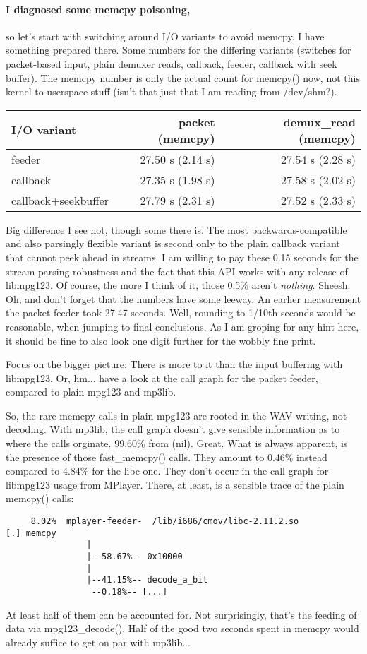 \documentclass[a4paper,12pt]{scrartcl}
\begin{document}
\paragraph{I diagnosed some memcpy poisoning,}
so let's start with switching around I/O variants to avoid memcpy. I have something prepared there.
Some numbers for the differing variants (switches for packet-based input, plain demuxer reads, callback, feeder, callback with seek buffer).
The memcpy number is only the actual count for memcpy() now, not this kernel-to-userspace stuff (isn't that just that I am reading from /dev/shm?).
\begin{center}
\begin{tabular}{lrr}
I/O variant & packet (memcpy) & demux\_read (memcpy)
\\\hline
feeder   & 27.50 s (2.14 s) & 27.54 s (2.28 s) \\ 
callback & 27.35 s (1.98 s) & 27.58 s (2.02 s) \\
callback+seekbuffer
         & 27.79 s (2.31 s) & 27.52 s (2.33 s)
\end{tabular}
\end{center}
Big difference I see not, though some there is.
The most backwards-compatible and also parsingly flexible variant is second only to the plain callback variant that cannot peek ahead in streams.
I am willing to pay these 0.15 seconds for the stream parsing robustness and the fact that this API works with any release of libmpg123. Of course, the more I think of it, those 0.5\% aren't {\em nothing}. Sheesh.
Oh, and don't forget that the numbers have some leeway. An earlier measurement the packet feeder took 27.47 seconds.
Well, rounding to 1/10th seconds would be reasonable, when jumping to final conclusions. As I am groping for any hint here, it should be fine to also look one digit further for the wobbly fine print.

Focus on the bigger picture: There is more to it than the input buffering with libmpg123.
Or, hm... have a look at the call graph for the packet feeder, compared to plain mpg123 and mp3lib.

So, the rare memcpy calls in plain mpg123 are rooted in the WAV writing, not decoding.
With mp3lib, the call graph doesn't give sensible information as to where the calls orginate. 99.60\% from (nil). Great.
What is always apparent, is the presence of those fast\_memcpy() calls. They amount to 0.46\% instead compared to 4.84\% for the libc one.
They don't occur in the call graph for libmpg123 usage from MPlayer.
There, at least, is a sensible trace of the plain memcpy() calls: 
\begin{verbatim}
     8.02%  mplayer-feeder-  /lib/i686/cmov/libc-2.11.2.so                                        [.] memcpy
                |          
                |--58.67%-- 0x10000
                |          
                |--41.15%-- decode_a_bit
                 --0.18%-- [...]
\end{verbatim}
At least half of them can be accounted for. Not surprisingly, that's the feeding of data via mpg123\_decode().
Half of the good two seconds spent in memcpy would already suffice to get on par with mp3lib...
\end{document}
